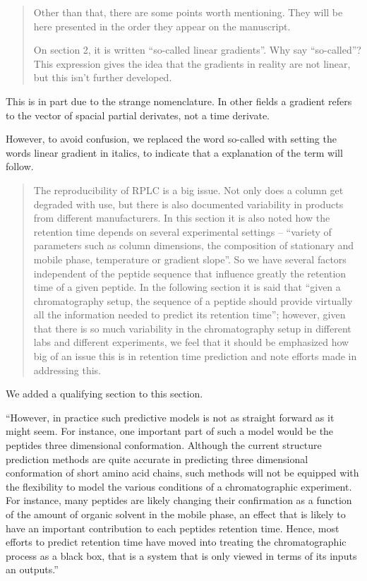 \documentclass[letterpaper]{article}
\newcommand{\breview}{\begin{quotation}\begin{bf}\noindent}
\newcommand{\ereview}{\end{bf}\end{quotation}}
\begin{document}
\breview


Other than that, there are some points worth mentioning. They will be
here presented in the order they appear on the manuscript.

On section 2, it is written ``so-called linear gradients''. Why say
``so-called''? This expression gives the idea that the gradients in
reality are not linear, but this isn’t further developed.

\ereview

This is in part due to the strange nomenclature. In other fields a
gradient refers to the vector of spacial partial derivates, not a time
derivate. 

However, to avoid confusion, we replaced the word so-called with
setting the words linear gradient in italics, to indicate that a
explanation of the term will follow. 

\breview

The reproducibility of RPLC is a big issue. Not only does a column get
degraded with use, but there is also documented variability in
products from different manufacturers. In this section it is also
noted how the retention time depends on several experimental settings
– ``variety of parameters such as column dimensions, the composition
of stationary and mobile phase, temperature or gradient slope''. So we
have several factors independent of the peptide sequence that
influence greatly the retention time of a given peptide. In the
following section it is said that ``given a chromatography setup, the
sequence of a peptide should provide virtually all the information
needed to predict its retention time''; however, given that there is
so much variability in the chromatography setup in different labs and
different experiments, we feel that it should be emphasized how big of
an issue this is in retention time prediction and note efforts made in
addressing this.

\ereview
We added a qualifying section to this section.

``However, in practice such predictive models is not as straight
forward as it might seem. For instance, one important part of such a
model would be the peptides three dimensional conformation. Although
the current structure prediction methods are quite accurate in
predicting three dimensional conformation of short amino acid chains,
such methods will not be equipped with the flexibility to model the
various conditions of a chromatographic experiment. For instance, many
peptides are likely changing their confirmation as a function of the
amount of organic solvent in the mobile phase, an effect that is
likely to have an important contribution to each peptides retention
time. Hence, most efforts to predict retention time have moved into
treating the chromatographic process as a black box, that is a system
that is only viewed in terms of its inputs an outputs.''
\end{document}
